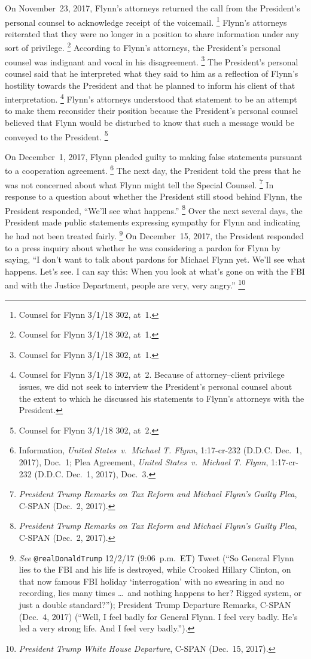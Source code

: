 On November~23, 2017, Flynn's attorneys returned the call from the President's personal counsel to acknowledge receipt of the voicemail.%
\footnote{Counsel for Flynn 3/1/18 302, at~1.}
Flynn's attorneys reiterated that they were no longer in a position to share information under any sort of privilege.%
\footnote{Counsel for Flynn 3/1/18 302, at~1.}
According to Flynn's attorneys, the President's personal counsel was indignant and vocal in his disagreement.%
\footnote{Counsel for Flynn 3/1/18 302, at~1.}
The President's personal counsel said that he interpreted what they said to him as a reflection of Flynn's hostility towards the President and that he planned to inform his client of that interpretation.%
\footnote{Counsel for Flynn 3/1/18 302, at~2.
Because of attorney--client privilege issues, we did not seek to interview the President's personal counsel about the extent to which he discussed his statements to Flynn's attorneys with the President.}
Flynn's attorneys understood that statement to be an attempt to make them reconsider their position because the President's personal counsel believed that Flynn would be disturbed to know that such a message would be conveyed to the President.%
\footnote{Counsel for Flynn 3/1/18 302, at~2.}

On December~1, 2017, Flynn pleaded guilty to making false statements pursuant to a cooperation agreement.%
\footnote{Information, \textit{United States~v.\ Michael T. Flynn}, 1:17-cr-232 (D.D.C. Dec.~1, 2017), Doc.~1;
Plea Agreement, \textit{United States~v.\ Michael T. Flynn}, 1:17-cr-232 (D.D.C. Dec.~1, 2017), Doc.~3.}
The next day, the President told the press that he was not concerned about what Flynn might tell the Special Counsel.%
\footnote{\textit{President Trump Remarks on Tax Reform and Michael Flynn's Guilty Plea}, C-SPAN (Dec.~2, 2017).}
In response to a question about whether the President still stood behind Flynn, the President responded, ``We'll see what happens.''%
\footnote{\textit{President Trump Remarks on Tax Reform and Michael Flynn's Guilty Plea}, C-SPAN (Dec.~2, 2017).}
Over the next several days, the President made public statements expressing sympathy for Flynn and indicating he had not been treated fairly.%
\footnote{\textit{See} \verb+@realDonaldTrump+ 12/2/17 (9:06~p.m.~ET) Tweet (``So General Flynn lies to the FBI and his life is destroyed, while Crooked Hillary Clinton, on that now famous FBI holiday `interrogation' with no swearing in and no recording, lies many times \dots\ and nothing happens to her?
Rigged system, or just a double standard?'');
President Trump Departure Remarks, C-SPAN (Dec.~4, 2017) (``Well, I feel badly for General Flynn.
I feel very badly.
He's led a very strong life.
And I feel very badly.'').}
On December~15, 2017, the President responded to a press inquiry about whether he was considering a pardon for Flynn by saying, ``I don't want to talk about pardons for Michael Flynn yet.
We'll see what happens.
Let's see.
I can say this: When you look at what's gone on with the FBI and with the Justice Department, people are very, very angry.''%
\footnote{\textit{President Trump White House Departure}, C-SPAN (Dec.~15, 2017).}

